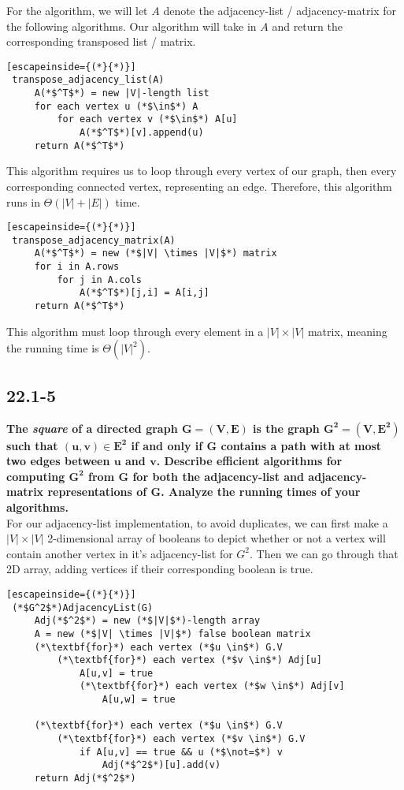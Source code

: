 \documentclass[11pt]{article}
\begin{document}
 For the algorithm, we will let $A$ denote the adjacency-list / adjacency-matrix for the following 
 algorithms.  Our algorithm will take in $A$ and return the corresponding transposed list / matrix.

\begin{lstlisting}[escapeinside={(*}{*)}]
 transpose_adjacency_list(A)
     A(*$^T$*) = new |V|-length list
     for each vertex u (*$\in$*) A
         for each vertex v (*$\in$*) A[u]
             A(*$^T$*)[v].append(u)
     return A(*$^T$*)
 \end{lstlisting}
 This algorithm requires us to loop through every vertex of our graph, then every corresponding 
 connected vertex, representing an edge.  Therefore, this algorithm runs in \(\Theta(|V| + |E|)\) 
 time. \\

\begin{lstlisting}[escapeinside={(*}{*)}]
 transpose_adjacency_matrix(A)
     A(*$^T$*) = new (*$|V| \times |V|$*) matrix 
     for i in A.rows
         for j in A.cols
             A(*$^T$*)[j,i] = A[i,j]
     return A(*$^T$*)
 \end{lstlisting}
 This algorithm must loop through every element in a \(|V| \times |V|\) matrix, meaning the running 
 time is \(\Theta(|V|^2)\).

 \newpage

 \subsection*{22.1-5}
 \textbf{The \textit{square} of a directed graph \(\mathbf{G = (V,E)}\) is the graph 
 \(\mathbf{G^2 = (V,E^2)}\) such that \(\mathbf{(u,v) \in E^2}\) if and only if \(\mathbf G\) 
 contains a path with at most two edges between \(\mathbf{u}\) and \(\mathbf{v}\). Describe 
 efficient algorithms for computing \(\mathbf{G^2}\) from \(\mathbf G\) for both the 
 adjacency-list and adjacency-matrix representations of \(\mathbf G\). Analyze the running times 
 of your algorithms.} \\

 For our adjacency-list implementation, to avoid duplicates, we can first make a $|V| \times |V|$ 
 2-dimensional array of booleans to depict whether or not a vertex will contain another vertex in 
 it's adjacency-list for $G^2$. Then we can go through that 2D array, adding vertices if their 
 corresponding boolean is true. \\

 \begin{lstlisting}[escapeinside={(*}{*)}]
 (*$G^2$*)AdjacencyList(G)
     Adj(*$^2$*) = new (*$|V|$*)-length array
     A = new (*$|V| \times |V|$*) false boolean matrix
     (*\textbf{for}*) each vertex (*$u \in$*) G.V
         (*\textbf{for}*) each vertex (*$v \in$*) Adj[u]
             A[u,v] = true
             (*\textbf{for}*) each vertex (*$w \in$*) Adj[v]
                 A[u,w] = true

     (*\textbf{for}*) each vertex (*$u \in$*) G.V
         (*\textbf{for}*) each vertex (*$v \in$*) G.V
             if A[u,v] == true && u (*$\not=$*) v
                 Adj(*$^2$*)[u].add(v)
     return Adj(*$^2$*)
 \end{lstlisting}
\end{document}
